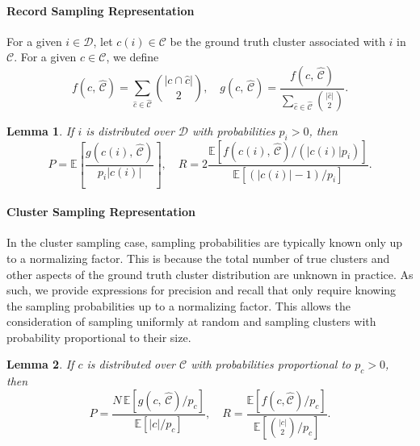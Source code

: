 \documentclass[fontsize=11pt]{article}
\newtheorem{lemma}{Lemma}
\theoremstyle{definition}
\begin{document}
\paragraph{Record Sampling Representation}
For a given $i \in \mathcal{D}$, let $c(i) \in \mathcal{C}$ be the ground truth cluster associated with $i$ in $\mathcal{C}$. For a given $c \in \mathcal{C}$, we define
\begin{equation}
    f(c,\, \widehat{\mathcal{C}}) = \sum_{\hat c \in \hat{\mathcal{C}}} { \lvert c \cap \hat c \rvert \choose 2 }, \quad g(c,\, \widehat{\mathcal{C}}) = \frac{f(c,\, \widehat{\mathcal{C}}) }{\sum_{\hat c \in \hat{\mathcal{C}}} { \lvert \hat c \rvert \choose 2 }}.
\end{equation}
\begin{lemma}\label{lemma:record_sampling_representation}
If $i$ is distributed over $\mathcal{D}$ with probabilities $p_i > 0$, then
\begin{equation}
    P = \mathbb{E} \left[ \frac{g(c(i),\, \widehat{\mathcal{C}})}{p_i \lvert c(i) \rvert} \right], \quad R = 2\frac{\mathbb{E}\left[ f(c(i),\, \widehat{\mathcal{C}})  \big/ (\lvert c(i) \rvert p_i) \right]}{\mathbb{E}\left[ (\lvert c(i) \rvert - 1) / p_i \right]}.
\end{equation}
\end{lemma}

\paragraph{Cluster Sampling Representation}

In the cluster sampling case, sampling probabilities are typically known only up to a normalizing factor. This is because the total number of true clusters and other aspects of the ground truth cluster distribution are unknown in practice. As such, we provide expressions for precision and recall that only require knowing the sampling probabilities up to a normalizing factor. This allows the consideration of sampling uniformly at random and sampling clusters with probability proportional to their size. 

\begin{lemma}\label{lemma:cluster_sampling_representation}
If $c$ is distributed over $\mathcal{C}$ with probabilities proportional to $p_c > 0$, then
\begin{equation}\label{eq:lemma_1}
    P = \frac{N\, \mathbb{E} \left[ g(c,\, \widehat{\mathcal{C}})/p_c \right]}{\mathbb{E} \left[ \vert c \rvert /p_c \right]}, \quad R = \frac{\mathbb{E}\left[ f(c, \widehat{\mathcal{C}})/p_c \right]}{\mathbb{E}\left[ {\lvert c \rvert \choose 2}/p_c \right]}.
\end{equation}
\end{lemma}
\end{document}
